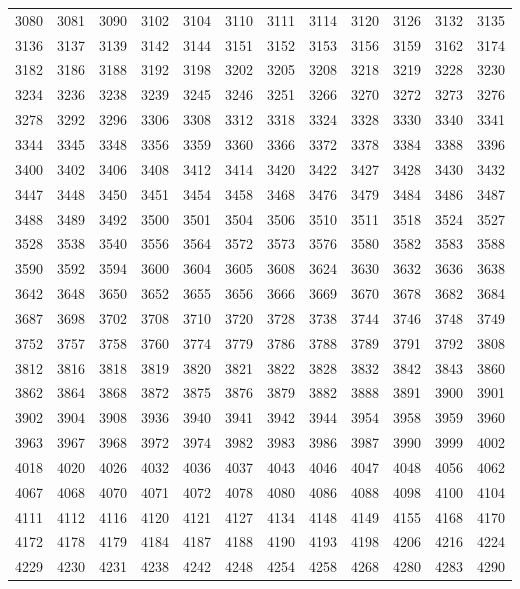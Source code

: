 \begin{center}
\begin{longtable}{llllllllllll}
3080 &3081 &3090 &3102 &3104 &3110 &3111 &3114 &3120 &3126 &3132 &3135 \\
3136 &3137 &3139 &3142 &3144 &3151 &3152 &3153 &3156 &3159 &3162 &3174 \\
3182 &3186 &3188 &3192 &3198 &3202 &3205 &3208 &3218 &3219 &3228 &3230 \\
3234 &3236 &3238 &3239 &3245 &3246 &3251 &3266 &3270 &3272 &3273 &3276 \\
3278 &3292 &3296 &3306 &3308 &3312 &3318 &3324 &3328 &3330 &3340 &3341 \\
3344 &3345 &3348 &3356 &3359 &3360 &3366 &3372 &3378 &3384 &3388 &3396 \\
3400 &3402 &3406 &3408 &3412 &3414 &3420 &3422 &3427 &3428 &3430 &3432 \\
3447 &3448 &3450 &3451 &3454 &3458 &3468 &3476 &3479 &3484 &3486 &3487 \\
3488 &3489 &3492 &3500 &3501 &3504 &3506 &3510 &3511 &3518 &3524 &3527 \\
3528 &3538 &3540 &3556 &3564 &3572 &3573 &3576 &3580 &3582 &3583 &3588 \\
3590 &3592 &3594 &3600 &3604 &3605 &3608 &3624 &3630 &3632 &3636 &3638 \\
3642 &3648 &3650 &3652 &3655 &3656 &3666 &3669 &3670 &3678 &3682 &3684 \\
3687 &3698 &3702 &3708 &3710 &3720 &3728 &3738 &3744 &3746 &3748 &3749 \\
3752 &3757 &3758 &3760 &3774 &3779 &3786 &3788 &3789 &3791 &3792 &3808 \\
3812 &3816 &3818 &3819 &3820 &3821 &3822 &3828 &3832 &3842 &3843 &3860 \\
3862 &3864 &3868 &3872 &3875 &3876 &3879 &3882 &3888 &3891 &3900 &3901 \\
3902 &3904 &3908 &3936 &3940 &3941 &3942 &3944 &3954 &3958 &3959 &3960 \\
3963 &3967 &3968 &3972 &3974 &3982 &3983 &3986 &3987 &3990 &3999 &4002 \\
4018 &4020 &4026 &4032 &4036 &4037 &4043 &4046 &4047 &4048 &4056 &4062 \\
4067 &4068 &4070 &4071 &4072 &4078 &4080 &4086 &4088 &4098 &4100 &4104 \\
4111 &4112 &4116 &4120 &4121 &4127 &4134 &4148 &4149 &4155 &4168 &4170 \\
4172 &4178 &4179 &4184 &4187 &4188 &4190 &4193 &4198 &4206 &4216 &4224 \\
4229 &4230 &4231 &4238 &4242 &4248 &4254 &4258 &4268 &4280 &4283 &4290 \\

\end{longtable}
\end{center}
